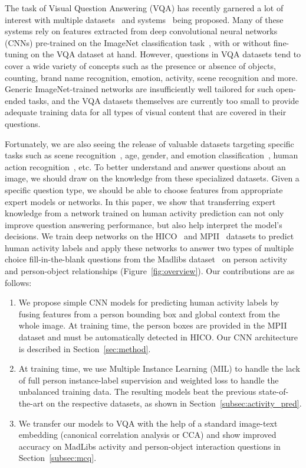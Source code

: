 \documentclass[runningheads]{llncs}
\begin{document}
The task of Visual Question Answering (VQA) has recently garnered a lot of interest with multiple datasets~\cite{malinowski2014multi,VQA,yu2015visual} and systems~\cite{xu2015ask,zhou2015simple,gao2015you,shih2015look,andreas2016neural,fukui2016multimodal,jabri2016revisiting} being proposed. Many of these systems rely on features extracted from deep convolutional neural networks (CNNs) pre-trained on the ImageNet classification task~\cite{ILSVRC15}, with or without fine-tuning on the VQA dataset at hand. However, questions in VQA datasets tend to cover a wide variety of concepts such as the presence or absence of objects, counting, brand name recognition, emotion, activity, scene recognition and more. Generic ImageNet-trained networks are insufficiently well tailored for such open-ended tasks, and the VQA datasets themselves are currently too small to provide adequate training data for all types of visual content that are covered in their questions.



Fortunately, we are also seeing the release of valuable datasets targeting specific tasks such as scene recognition~\cite{zhou2014learning}, age, gender, and emotion classification~\cite{levi2015age,levi2015emotion}, human action recognition~\cite{maji2011action,chao2015hico,pishchulin2014fine}, etc. To better understand and answer questions about an image, we should draw on the knowledge from these specialized datasets. Given a specific question type, we should be able to choose features from appropriate expert models or networks. 
In this paper, we show that transferring expert knowledge from a network trained on human activity prediction can not only improve question answering performance, but also help interpret the model's decisions. We train deep networks on the HICO~\cite{chao2015hico} and MPII~\cite{pishchulin2014fine} datasets to predict human activity labels and apply these networks to answer two types of multiple choice fill-in-the-blank questions from the Madlibs dataset~\cite{yu2015visual} on person activity and person-object relationships (Figure~\ref{fig:overview}). Our contributions are as follows:
\begin{enumerate}
\item We propose simple CNN models for predicting human activity labels by fusing features from a person bounding box and global context from the whole image. At training time, the person boxes are provided in the MPII dataset and must be automatically detected in HICO. Our CNN architecture is described in Section~\ref{sec:method}. 
\item At training time, we use Multiple Instance Learning (MIL) to handle the lack of full person instance-label supervision and weighted loss to handle the unbalanced training data. The resulting models beat the previous state-of-the-art on the respective datasets, as shown in Section~\ref{subsec:activity_pred}.
\item We transfer our models to VQA with the help of a standard image-text embedding (canonical correlation analysis or CCA) and show improved accuracy on MadLibs activity and person-object interaction questions in Section~\ref{subsec:mcq}.
\end{enumerate}
\end{document}
